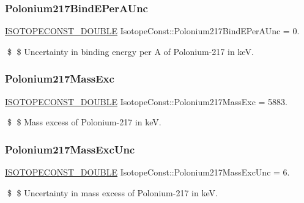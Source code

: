 \subsubsection{\texorpdfstring{Polonium217\+Bind\+E\+Per\+A\+Unc}{Polonium217BindEPerAUnc}}
{\footnotesize\ttfamily \mbox{\hyperlink{group___isotope_const-_macros_ga8f45a7272ce02c0b4c65c44636ed719a}{I\+S\+O\+T\+O\+P\+E\+C\+O\+N\+S\+T\+\_\+\+D\+O\+U\+B\+LE}} Isotope\+Const\+::\+Polonium217\+Bind\+E\+Per\+A\+Unc = 0.}

\$ \$ Uncertainty in binding energy per A of Polonium-\/217 in keV. \mbox{\label{group___isotope_const-_polonium-_po217_gac0b2142f139ff381c21bd914f59b2041}} 
\subsubsection{\texorpdfstring{Polonium217\+Mass\+Exc}{Polonium217MassExc}}
{\footnotesize\ttfamily \mbox{\hyperlink{group___isotope_const-_macros_ga8f45a7272ce02c0b4c65c44636ed719a}{I\+S\+O\+T\+O\+P\+E\+C\+O\+N\+S\+T\+\_\+\+D\+O\+U\+B\+LE}} Isotope\+Const\+::\+Polonium217\+Mass\+Exc = 5883.}

\$ \$ Mass excess of Polonium-\/217 in keV. \mbox{\label{group___isotope_const-_polonium-_po217_ga5fa3a36d6d9a4d0c55f17bf97e469d39}} 
\subsubsection{\texorpdfstring{Polonium217\+Mass\+Exc\+Unc}{Polonium217MassExcUnc}}
{\footnotesize\ttfamily \mbox{\hyperlink{group___isotope_const-_macros_ga8f45a7272ce02c0b4c65c44636ed719a}{I\+S\+O\+T\+O\+P\+E\+C\+O\+N\+S\+T\+\_\+\+D\+O\+U\+B\+LE}} Isotope\+Const\+::\+Polonium217\+Mass\+Exc\+Unc = 6.}

\$ \$ Uncertainty in mass excess of Polonium-\/217 in keV. \mbox{\label{group___isotope_const-_polonium-_po217_gaad526a8da8f933079c3418dad1dd6eb3}} 
